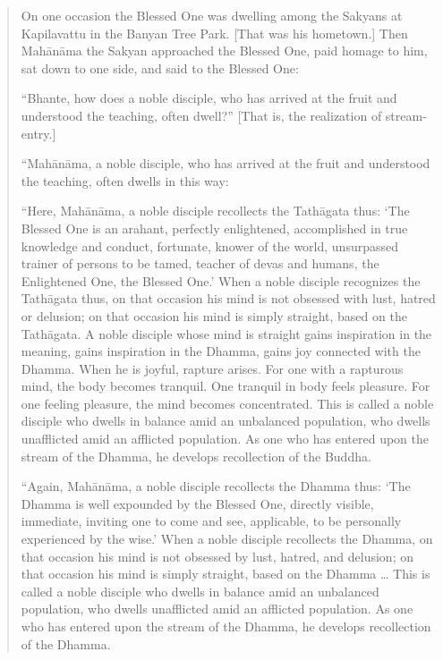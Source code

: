 \begin{quotation}
On one occasion the Blessed One was dwelling among the Sakyans at
Kapilavattu in the Banyan Tree Park. {[}That was his hometown.{]} Then
Mahānāma the Sakyan approached the Blessed One, paid homage to him, sat
down to one side, and said to the Blessed One:

“Bhante, how does a noble disciple, who has arrived at the fruit and
understood the teaching, often dwell?” {[}That is, the realization of
stream-entry.{]}

“Mahānāma, a noble disciple, who has arrived at the fruit and understood
the teaching, often dwells in this way:

“Here, Mahānāma, a noble disciple recollects the Tathāgata thus: ‘The
Blessed One is an arahant, perfectly enlightened, accomplished in true
knowledge and conduct, fortunate, knower of the world, unsurpassed
trainer of persons to be tamed, teacher of devas and humans, the
Enlightened One, the Blessed One.’ When a noble disciple recognizes the
Tathāgata thus, on that occasion his mind is not obsessed with lust,
hatred or delusion; on that occasion his mind is simply straight, based
on the Tathāgata. A noble disciple whose mind is straight gains
inspiration in the meaning, gains inspiration in the Dhamma, gains joy
connected with the Dhamma. When he is joyful, rapture arises. For one
with a rapturous mind, the body becomes tranquil. One tranquil in body
feels pleasure. For one feeling pleasure, the mind becomes concentrated.
This is called a noble disciple who dwells in balance amid an unbalanced
population, who dwells unafflicted amid an afflicted population. As one
who has entered upon the stream of the Dhamma, he develops recollection
of the Buddha.

“Again, Mahānāma, a noble disciple recollects the Dhamma thus: ‘The
Dhamma is well expounded by the Blessed One, directly visible,
immediate, inviting one to come and see, applicable, to be personally
experienced by the wise.’ When a noble disciple recollects the Dhamma,
on that occasion his mind is not obsessed by lust, hatred, and delusion;
on that occasion his mind is simply straight, based on the Dhamma \ldots{}
This is called a noble disciple who dwells in balance amid an unbalanced
population, who dwells unafflicted amid an afflicted population. As one
who has entered upon the stream of the Dhamma, he develops recollection
of the Dhamma.


\end{quotation}
